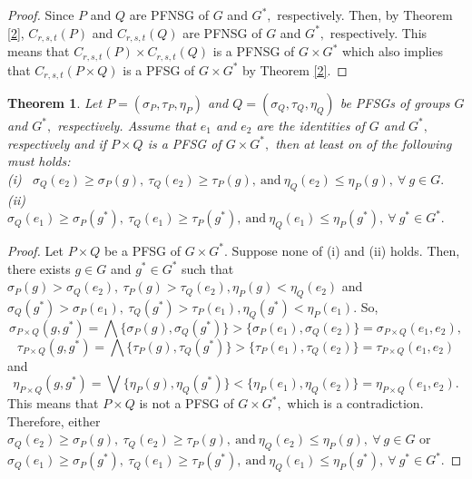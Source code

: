 \documentclass[12pt,letterpaper]{amsart}
\theoremstyle{plain}
\newtheorem{theorem}{Theorem}[section]
\theoremstyle{definition}
\numberwithin{equation}{section}
\begin{document}
\begin{proof}
Since $P$ and $Q$ are PFNSG of $G$ and $G^{*},$ respectively. Then, by Theorem \ref{2}, $C_{r, s, t} (P)$ and $C_{r, s, t} (Q)$ are PFNSG of $G$ and $G^{*},$ respectively. This means that $C_{r, s, t} (P) \times C_{r, s, t} (Q)$ is a PFNSG of $G \times G^{*}$ which also implies that $C_{r, s, t} (P \times Q)$ is a PFSG of $G \times G^{*}$ by Theorem \ref{2}. 
\end{proof}

\begin{theorem} \label{b}
Let $P = (\sigma_P, \tau_P, \eta_P)$ and $Q = (\sigma_Q, \tau_Q, \eta_Q)$ be PFSGs of groups $G$ and $G^{*},$ respectively. Assume that $e_1$ and $e_2$ are the identities of $G$ and $G^{*},$ respectively and if $P \times Q$ is a PFSG of $G \times G^{*},$ then at least on of the following must holds:\\
(i)~ $\sigma_Q(e_2) \geq \sigma_P(g),~ \tau_Q(e_2) \geq \tau_P(g),~\text{and}~\eta_Q(e_2) \leq \eta_P(g),~\forall~g \in G.$\\ 
(ii)~ $\sigma_Q(e_1) \geq \sigma_P(g^*),~ \tau_Q(e_1) \geq \tau_P(g^*),~\text{and}~\eta_Q(e_1) \leq \eta_P(g^*),~\forall~g^* \in G^*.$
\end{theorem}

\begin{proof}
Let $P \times Q$ be a PFSG of $G \times G^{*}.$ Suppose none of (i) and (ii) holds. Then, there exists $g \in G$ and $g^* \in G^*$ such that\\ $\sigma_P(g) > \sigma_Q(e_2),~ \tau_P(g) > \tau_Q(e_2), \eta_P(g) < \eta_Q(e_2)$ and \\ $\sigma_Q(g^*) > \sigma_P(e_1),~ \tau_Q(g^*) > \tau_P(e_1), \eta_Q(g^*) < \eta_P(e_1).$ So, $$\sigma_{P \times Q}(g, g^*) = \bigwedge \{\sigma_P(g), \sigma_Q(g^*)\} > \{\sigma_P(e_1), \sigma_Q(e_2)\} = \sigma_{P \times Q}(e_1, e_2),$$ $$\tau_{P \times Q}(g, g^*) = \bigwedge \{\tau_P(g), \tau_Q(g^*)\} > \{\tau_P(e_1), \tau_Q(e_2)\} = \tau_{P \times Q}(e_1, e_2)$$ and $$\eta_{P \times Q}(g, g^*) = \bigvee \{\eta_P(g), \eta_Q(g^*)\} < \{\eta_P(e_1), \eta_Q(e_2)\} = \eta_{P \times Q}(e_1, e_2).$$ This means that $P \times Q$ is not a PFSG of $G \times G^{*},$ which is a contradiction. Therefore, either $\sigma_Q(e_2) \geq \sigma_P(g),~ \tau_Q(e_2) \geq \tau_P(g),~\text{and}~\eta_Q(e_2) \leq \eta_P(g),~\forall~g \in G$ or  $\sigma_Q(e_1) \geq \sigma_P(g^*),~ \tau_Q(e_1) \geq \tau_P(g^*),~\text{and}~\eta_Q(e_1) \leq \eta_P(g^*),~\forall~g^* \in G^*.$ 
\end{proof}
\end{document}
